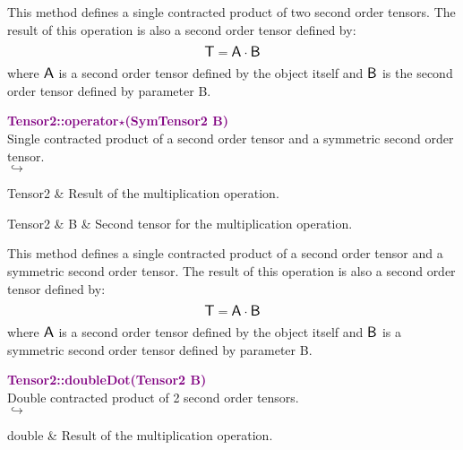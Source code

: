 This method defines a single contracted product of two second order tensors.
The result of this operation is also a second order tensor defined by:
\begin{equation*}
\mbox{\large\ensuremath{\mathsf{T}}} = \mbox{\large\ensuremath{\mathsf{A}}} \cdot \mbox{\large\ensuremath{\mathsf{B}}}
\end{equation*}
where $\mbox{\large\ensuremath{\mathsf{A}}}$ is a second order tensor defined by the object itself and $\mbox{\large\ensuremath{\mathsf{B}}}$ is the second order tensor defined by parameter B.

\textcolor{purple}{\textbf{Tensor2::operator$\star$(SymTensor2 B)}}\label{Tensor2::operator*(SymTensor2 B)}\\
Single contracted product of a second order tensor and a symmetric second order tensor.\\ \hspace*{5mm}$\hookrightarrow$
\vspace*{-2em}\begin{tcolorbox}[grow to left by=-1cm, width=\textwidth-1cm,myArgs,tabularx={l|R}]
Tensor2 & Result of the multiplication operation.
\end{tcolorbox}

\begin{tcolorbox}[width=\textwidth,myArgs,tabularx={ll|R}]
Tensor2 & B & Second tensor for the multiplication operation.
\end{tcolorbox}

This method defines a single contracted product of a second order tensor and a symmetric second order tensor.
The result of this operation is also a second order tensor defined by:
\begin{equation*}
\mbox{\large\ensuremath{\mathsf{T}}} = \mbox{\large\ensuremath{\mathsf{A}}} \cdot \mbox{\large\ensuremath{\mathsf{B}}}
\end{equation*}
where $\mbox{\large\ensuremath{\mathsf{A}}}$ is a second order tensor defined by the object itself and $\mbox{\large\ensuremath{\mathsf{B}}}$ is a symmetric second order tensor defined by parameter B.

\textcolor{purple}{\textbf{Tensor2::doubleDot(Tensor2 B)}}\label{Tensor2::doubleDot(Tensor2 B)}\\
Double contracted product of 2 second order tensors.\\ \hspace*{5mm}$\hookrightarrow$
\vspace*{-2em}\begin{tcolorbox}[grow to left by=-1cm, width=\textwidth-1cm,myArgs,tabularx={l|R}]
double & Result of the multiplication operation.
\end{tcolorbox}

